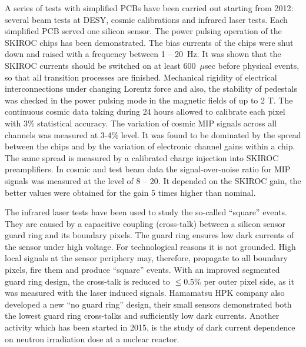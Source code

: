 \documentclass{article}
\begin{document}
A series of tests with simplified PCBs have been carried out starting from
2012: several beam tests at DESY, cosmic calibrations and infrared laser
tests. Each simplified PCB served one silicon sensor.  The power pulsing
operation of the SKIROC chips has been demonstrated. The bias currents of the
chips were shut down and raised with a frequency between 1 -- 20~Hz.  It was
shown that the SKIROC currents should be switched on at least 600~$\mu$sec
before physical events, so that all transition processes are finished.
Mechanical rigidity of electrical interconnections under changing Lorentz
force and also, the stability of pedestals was checked in the power pulsing
mode in the magnetic fields of up to 2 T.  The continuous cosmic data taking
during 24 hours allowed to calibrate each pixel with 3\% statistical accuracy.
The variation of cosmic MIP signals across all channels was measured at 3-4\%
level.  It was found to be dominated by the spread between the chips and by
the variation of electronic channel gains within a chip. The same spread is
measured by a calibrated charge injection into SKIROC preamplifiers.  In
cosmic and test beam data the signal-over-noise ratio for MIP signals was
measured at the level of 8 -- 20. It depended on the SKIROC gain, the better
values were obtained for the gain 5 times higher than nominal.

The infrared laser tests have been used to study the so-called ``square''
events. They are caused by a capacitive coupling (cross-talk) between a
silicon sensor guard ring and its boundary pixels. The guard ring ensures low
dark currents of the sensor under high voltage. For technological reasons it
is not grounded. High local signals at the sensor periphery may, therefore,
propagate to all boundary pixels, fire them and produce ``square''
events. With an improved segmented guard ring design, the cross-talk is
reduced to $\le$0.5\% per outer pixel side, as it was measured with the laser
induced signals. Hamamatsu HPK company also developed a new ``no guard ring''
design, their small sensors demonstrated both the lowest guard ring
cross-talks and sufficiently low dark currents. Another activity which has
been started in 2015, is the study of dark current dependence on neutron
irradiation dose at a nuclear reactor.
\end{document}
